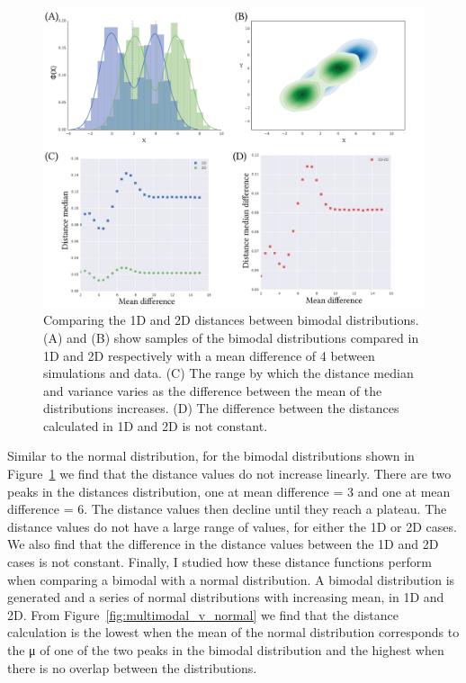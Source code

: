 \begin{figure}[tb]
\centering
\includegraphics[scale=0.7]{../../chapters/chapterABCFlow/images/multimodal_musd.png}
\caption[Distance value ranges of bimodal distributions using the kernel distance]{\label{fig:multimodal_musd}Comparing the 1D and 2D distances between bimodal distributions. (A) and (B) show samples of the bimodal distributions compared in 1D and 2D respectively with a mean difference of 4 between simulations and data. (C) The range by which the distance median and variance varies as the difference between the mean of the distributions increases. (D) The difference between the distances calculated in 1D and 2D is not constant.}

\end{figure}

Similar to the normal distribution, for the bimodal distributions shown in Figure~\ref{fig:multimodal_musd} we find that the distance values do not increase linearly. There are two peaks in the distances distribution, one at mean difference = 3 and one at mean difference = 6. The distance values then decline until they reach a plateau. The distance values do not have a large range of values, for either the 1D or 2D cases. We also find that the difference in the distance values between the 1D and 2D cases is not constant. Finally, I studied how these distance functions perform when comparing a bimodal with a normal distribution. A bimodal distribution is generated and a series of normal distributions with increasing mean, in 1D and 2D. From Figure~\ref{fig:multimodal_v_normal} we find that the distance calculation is the lowest when the mean of the normal distribution corresponds to the μ of one of the two peaks in the bimodal distribution and the highest when there is no overlap between the distributions.


